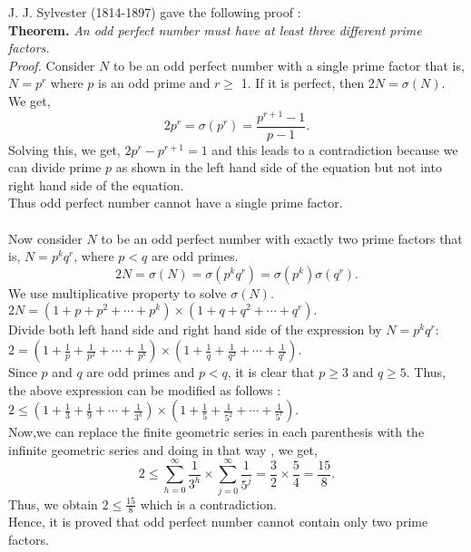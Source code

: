 \documentclass[a4paper,11pt]{article}
\begin{document}
J. J. Sylvester (1814-1897) gave the following proof :\\
\textbf{Theorem.} \textit{An odd perfect number must have at least three different prime factors.}\\
\textit{Proof.} Consider $N$ to be an odd perfect number with a single prime 
factor that is, $N = p^r$ where $p$ is an odd prime and $r \geq$ 1. If it is perfect, then $2N = \sigma(N)$. We get,\\
$$ 2p^r = \sigma(p^r) = \frac{p^{r+1}-1}{p-1}.$$
Solving this, we get, $2p^r - p^{r+1} = 1$ and this leads to a contradiction because we can divide prime $p$ as shown in the left hand side of the equation but not into right hand side of the equation.\\
Thus odd perfect number cannot have a single prime factor.\\
\\
\noindent Now consider $N$ to be an odd perfect number with exactly two prime factors that is, $N = p^kq^r$, where $p < q$ are odd primes. \\
$$2N = \sigma(N) = \sigma(p^kq^r) = \sigma(p^k)\sigma(q^r).$$
We use multiplicative property to solve $\sigma(N)$.\\
$2N = (1 + p + p^2 + \cdots + p^k) \times (1 + q + q^2 + \cdots + q^r).$\\
Divide both left hand side and right hand side of the expression by $N = p^kq^r$:\\
$2 = (1 + \frac{1}{p} + \frac{1}{p^2} + \cdots + \frac{1}{p^k}) \times (1 + \frac{1}{q} + \frac{1}{q^2} + \cdots + \frac{1}{q^r}).$\\
Since $p$ and $q$ are odd primes and $p<q$, it is clear that $p \geq 3 $ and $q \geq 5$. Thus, the above expression can be modified as follows :\\
$2 \leq (1 + \frac{1}{3} + \frac{1}{9} + \cdots + \frac{1}{3^k}) \times (1 + \frac{1}{5} + \frac{1}{5^2} + \cdots + \frac{1}{5^r}).$\\
Now,we can replace the finite geometric series in each parenthesis with the infinite geometric series and doing in that way , we get,\\
$$2 \leq \sum_{h=0}^{\infty} \frac{1}{3^h} \times \sum_{j=0}^{\infty} \frac{1}{5^j} = \frac{3}{2} \times \frac{5}{4} = \frac{15}{8}.$$
Thus, we obtain $2 \leq \frac{15}{8}$ which is a contradiction.\\
Hence, it is proved that odd perfect number cannot contain only two prime factors.\\
\\
\end{document}
